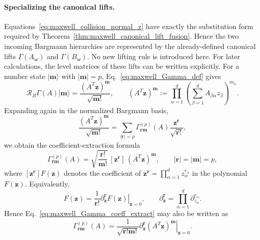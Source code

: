 \documentclass[11pt,oneside]{article}
\numberwithin{equation}{section}
\theoremstyle{definition}
\begin{document}
\paragraph{Specializing the canonical lifts.}
Equations~\eqref{eq:maxwell_collision_normal_z} have exactly the substitution form required by Theorem~\ref{thm:maxwell_canonical_lift_fusion}.  Hence the two incoming Bargmann hierarchies are represented by the already-defined canonical lifts $\Gamma(A_{\bm\omega})$ and $\Gamma(B_{\bm\omega})$.  No new lifting rule is introduced here.  For later calculations, the level matrices of these lifts can be written explicitly.  For a number state
$|\bm m\rangle$ with $|\bm m|=p$, Eq.~\eqref{eq:maxwell_Gamma_def} gives
\begin{equation}
\mathcal R_B\Gamma(A)|\bm m\rangle
=
\frac{(A^T\bm z)^{\bm m}}{\sqrt{\bm m!}},
\qquad
(A^T\bm z)^{\bm m}
:=
\prod_{\alpha=1}^{d}
\left(
\sum_{\beta=1}^{d}A_{\beta\alpha}z_\beta
\right)^{m_\alpha}.
\label{eq:maxwell_Gamma_number_symbol}
\end{equation}
Expanding again in the normalized Bargmann basis,
\begin{equation}
\frac{(A^T\bm z)^{\bm m}}{\sqrt{\bm m!}}
=
\sum_{|\bm r|=p}
\Gamma^{(p)}_{\bm r\bm m}(A)
\frac{\bm z^{\bm r}}{\sqrt{\bm r!}},
\end{equation}
we obtain the coefficient-extraction formula
\begin{equation}
\Gamma^{(p)}_{\bm r\bm m}(A)
=
\sqrt{\frac{\bm r!}{\bm m!}}
\,[\bm z^{\bm r}]\,(A^T\bm z)^{\bm m},
\qquad
|\bm r|=|\bm m|=p,
\label{eq:maxwell_Gamma_coeff_extract}
\end{equation}
%
%
where $[\bm z^{\bm r}]F(\bm z)$ denotes the coefficient of
$\bm z^{\bm r}=\prod_{\alpha=1}^d z_\alpha^{r_\alpha}$ in the polynomial
$F(\bm z)$. Equivalently,
\begin{equation}
[\bm z^{\bm r}]F(\bm z)
=
\frac{1}{\bm r!}
\left.
\partial_{\bm z}^{\bm r}F(\bm z)
\right|_{\bm z=0},
\qquad
\partial_{\bm z}^{\bm r}
=\prod_{\alpha=1}^d \partial_{z_\alpha}^{r_\alpha}.
\end{equation}
Hence Eq.~\eqref{eq:maxwell_Gamma_coeff_extract} may also be written as
\begin{equation}
\Gamma^{(p)}_{\bm r\bm m}(A)
=
\frac{1}{\sqrt{\bm r!\bm m!}}
\left.
\partial_{\bm z}^{\bm r}
(A^T\bm z)^{\bm m}
\right|_{\bm z=0}.
\end{equation}
\end{document}
